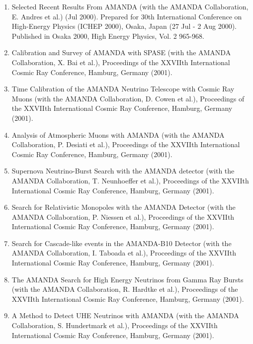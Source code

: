 \begin{enumerate}
\item Selected Recent Results From AMANDA (with the AMANDA
  Collaboration, E. Andres et al.) (Jul 2000).  Prepared for 30th
  International Conference on High-Energy Physics (ICHEP 2000), Osaka,
  Japan (27 Jul - 2 Aug 2000).  Published in Osaka 2000, High Energy
  Physics, Vol. 2 965-968.

\item Calibration and Survey of AMANDA with SPASE (with the AMANDA
  Collaboration, X. Bai et al.), Proceedings of the XXVIIth
  International Cosmic Ray Conference, Hamburg, Germany (2001).

\item Time Calibration of the AMANDA Neutrino Telescope with Cosmic
  Ray Muons (with the AMANDA Collaboration, D. Cowen et al.),
  Proceedings of the XXVIIth International Cosmic Ray Conference,
  Hamburg, Germany (2001).

\item Analysis of Atmospheric Muons with AMANDA (with the AMANDA
  Collaboration, P. Desiati et al.), Proceedings of the XXVIIth
  International Cosmic Ray Conference, Hamburg, Germany (2001).

\item Supernova Neutrino-Burst Search with the AMANDA detector (with
  the AMANDA Collaboration, T. Neunhoeffer et al.), Proceedings of the
  XXVIIth International Cosmic Ray Conference, Hamburg, Germany
  (2001).

\item Search for Relativistic Monopoles with the AMANDA Detector (with
  the AMANDA Collaboration, P. Niessen et al.), Proceedings of the
  XXVIIth International Cosmic Ray Conference, Hamburg, Germany
  (2001).

\item Search for Cascade-like events in the AMANDA-B10 Detector (with
  the AMANDA Collaboration, I. Taboada et al.), Proceedings of the
  XXVIIth International Cosmic Ray Conference, Hamburg, Germany
  (2001).

\item The AMANDA Search for High Energy Neutrinos from Gamma Ray
  Bursts (with the AMANDA Collaboration, R. Hardtke et al.),
  Proceedings of the XXVIIth International Cosmic Ray Conference,
  Hamburg, Germany (2001).

\item A Method to Detect UHE Neutrinos with AMANDA (with the AMANDA
  Collaboration, S. Hundertmark et al.), Proceedings of the XXVIIth
  International Cosmic Ray Conference, Hamburg, Germany (2001).


\end{enumerate}
